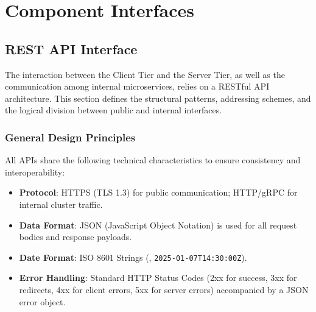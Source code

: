 \section{Component Interfaces}
\subsection{REST API Interface}

The interaction between the Client Tier and the Server Tier, as well as the communication among internal microservices, relies on a RESTful API architecture.
This section defines the structural patterns, addressing schemes, and the logical division between public and internal interfaces.

\subsubsection*{General Design Principles}
All APIs share the following technical characteristics to ensure consistency and interoperability:
\begin{itemize}
    \item \textbf{Protocol}: HTTPS (TLS 1.3) for public communication; HTTP/gRPC for internal cluster traffic.
    \item \textbf{Data Format}: JSON (JavaScript Object Notation) is used for all request bodies and response payloads.
    \item \textbf{Date Format}: ISO 8601 Strings (\eg, \texttt{2025-01-07T14:30:00Z}).
    \item \textbf{Error Handling}: Standard HTTP Status Codes (2xx for success, 3xx for redirects, 4xx for client errors, 5xx for server errors) accompanied by a JSON error object.
\end{itemize}

